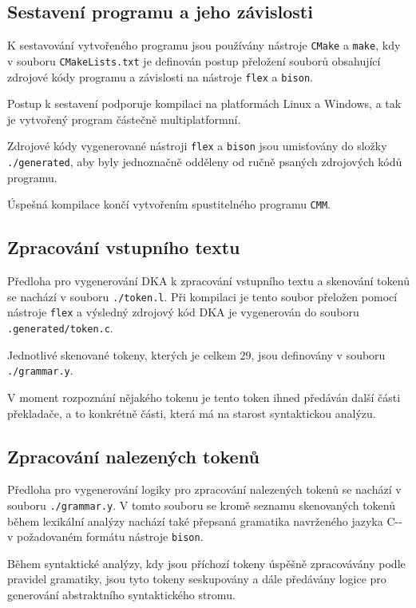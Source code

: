 \documentclass[12pt, a4paper]{article}
\begin{document}
\subsection{Sestavení programu a jeho závislosti}
K sestavování vytvořeného programu jsou používány nástroje \texttt{CMake} a \texttt{make}, kdy v souboru \texttt{CMakeLists.txt} je definován postup přeložení souborů obsahující zdrojové kódy programu a závislosti na nástroje \texttt{flex} a \texttt{bison}.

Postup k sestavení podporuje kompilaci na platformách Linux a Windows, a tak je vytvořený program částečně multiplatformní.

Zdrojové kódy vygenerované nástroji \texttt{flex} a \texttt{bison} jsou umisťovány do složky \texttt{./generated}, aby byly jednoznačně odděleny od ručně psaných zdrojových kódů programu.

Úspešná kompilace končí vytvořením spustitelného programu \texttt{CMM}.


\subsection{Zpracování vstupního textu}

Předloha pro vygenerování DKA k zpracování vstupního textu a skenování tokenů se nachází v souboru \texttt{./token.l}. Při kompilaci je tento soubor přeložen pomocí nástroje \texttt{flex} a výsledný zdrojový kód DKA je vygenerován do souboru \texttt{.generated/token.c}.

Jednotlivé skenované tokeny, kterých je celkem 29, jsou definovány v souboru \texttt{./grammar.y}.

V moment rozpoznání nějakého tokenu je tento token ihned předáván další části překladače, a to konkrétně části, která má na starost syntaktickou analýzu.


\subsection{Zpracování nalezených tokenů}

Předloha pro vygenerování logiky pro zpracování nalezených tokenů se nachází v souboru \texttt{./grammar.y}. V tomto souboru se kromě seznamu skenovaných tokenů během lexikální analýzy nachází také přepsaná gramatika navrženého jazyka C-{}- v požadovaném formátu nástroje \texttt{bison}.

Během syntaktické analýzy, kdy jsou příchozí tokeny úspěšně zpracovávány podle pravidel gramatiky, jsou tyto tokeny seskupovány a dále předávány logice pro generování abstraktního syntaktického stromu.
\end{document}
